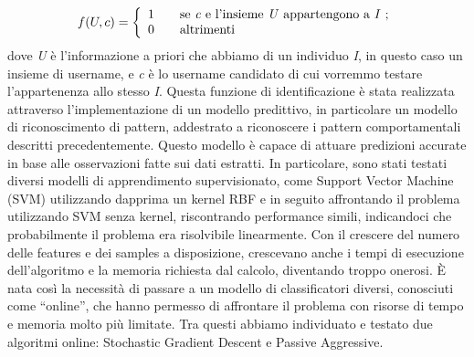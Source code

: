 \[ f(U,c) = \left\{
\begin{array}{l l}
	1 & \quad \text{se \textit{c} e l'insieme \textit{U} appartengono a \textit{I} ;}\\
	0 & \quad \text{altrimenti}
	\end{array} \right.\] dove \textit{U} è l'informazione a priori che abbiamo di un individuo \textit{I}, in questo caso un insieme di username, e \textit{c} è lo username candidato di cui vorremmo testare l'appartenenza allo stesso \textit{I}.
Questa funzione di identificazione è stata realizzata attraverso l'implementazione di un modello predittivo, in particolare un modello di riconoscimento di pattern, addestrato a riconoscere i pattern comportamentali descritti precedentemente. Questo modello è capace di attuare predizioni accurate in base alle osservazioni fatte sui dati estratti. In particolare, sono stati testati diversi modelli di apprendimento supervisionato, come Support Vector Machine (SVM) utilizzando dapprima un kernel RBF e in seguito affrontando il problema utilizzando SVM senza kernel, riscontrando performance simili, indicandoci che probabilmente il problema era risolvibile linearmente. Con il crescere del numero delle features e dei samples a disposizione, crescevano anche i tempi di esecuzione dell'algoritmo e la memoria richiesta dal calcolo, diventando troppo onerosi. È nata così la necessità di passare a un modello di classificatori diversi, conosciuti come “online”, che hanno permesso di affrontare il problema con risorse di tempo e memoria molto più limitate. Tra questi abbiamo individuato e testato due algoritmi online: Stochastic Gradient Descent e Passive Aggressive.

